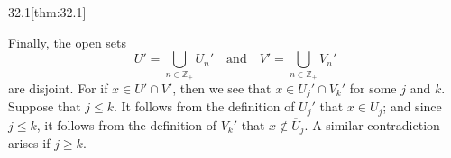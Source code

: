 \begin{thmBox}{32.1}[thm:32.1]
\begin{proofBox}
        Finally, the open sets 
        \begin{equation*}
            U'
            =
            \bigcup_{ n \in \mathbb{Z}_{ + } } U_{ n }'
            \quad \mathrm{and} \quad 
            V'  
            =
            \bigcup_{ n \in \mathbb{Z}_{ + } } V_{ n }'
        \end{equation*}
        are disjoint. 
        For if \( x \in U' \cap V' \), then we see that 
        \( x \in U_{ j }' \cap V_{ k }' \) for some \( j \) and \( k \).
        Suppose that \( j \leq k \). 
        It follows from the definition of \( U_{ j }' \) that \( x \in U_{ j } \);
        and since \( j \leq k \), it follows from the definition of \( V_{ k }' \)
        that \( x \notin \overline{ U }_{ j } \).
        A similar contradiction arises if \( j \geq k \).
    \end{proofBox}
\end{thmBox}

